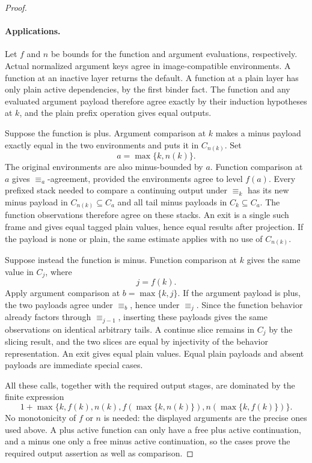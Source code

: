 \begin{proof}
\paragraph{Applications.}
\label{obs:bound-applications}
Let $f$ and $n$ be bounds for the function and argument evaluations,
respectively.  Actual normalized argument keys agree in image-compatible
environments.  A function at an inactive layer returns the default.  A
function at a plain layer has only plain active dependencies, by the
first binder fact.  The function and any evaluated argument payload
therefore agree exactly by their induction hypotheses at $k$, and the
plain prefix operation gives equal outputs.

Suppose the function is plus.  Argument comparison at $k$ makes a minus
payload exactly equal in the two environments and puts it in
$C_{n(k)}$.  Set
\[
                 a=\max\{k,n(k)\}.
\]
The original environments are also minus-bounded by $a$.  Function
comparison at $a$ gives $\equiv_a$-agreement, provided the environments
agree to level $f(a)$.  Every prefixed stack needed to compare a
continuing output under $\equiv_k$ has its new minus payload in
$C_{n(k)}\subseteq C_a$ and all tail minus payloads in
$C_k\subseteq C_a$.  The function observations therefore agree on
these stacks.  An exit is a single such frame and gives equal tagged
plain values, hence equal results after projection.  If the payload is
none or plain, the same estimate applies with no use of $C_{n(k)}$.

Suppose instead the function is minus.  Function comparison at $k$
gives the same value in $C_j$, where
\[
                         j=f(k).
\]
Apply argument comparison at $b=\max\{k,j\}$.  If the argument payload
is plus, the two payloads agree under $\equiv_b$, hence under
$\equiv_j$.  Since the function behavior already factors through
$\equiv_{j-1}$, inserting these payloads gives the same observations
on identical arbitrary tails.  A continue slice remains in $C_j$ by
the slicing result, and the two slices are equal by injectivity of the
behavior representation.  An exit gives equal plain values.  Equal
plain payloads and absent payloads are immediate special cases.

All these calls, together with the required output stages, are dominated
by the finite expression
\begin{equation}
  1+\max\bigl\{k,f(k),n(k),
       f(\max\{k,n(k)\}),n(\max\{k,f(k)\})\bigr\}.
  \label{obs:bound-application-formula}
\end{equation}
No monotonicity of $f$ or $n$ is needed: the displayed arguments are
the precise ones used above.  A plus active function can only have a
free plus active continuation, and a minus one only a free minus
active continuation, so the cases prove the required output assertion
as well as comparison.


\end{proof}
